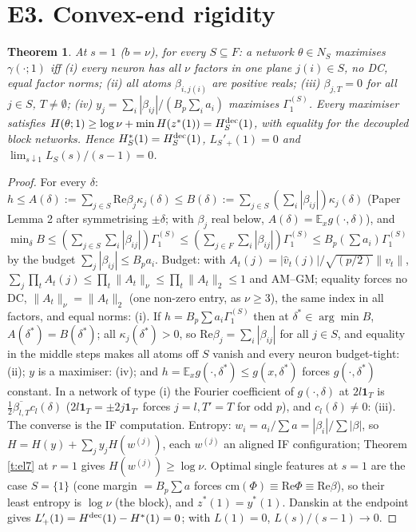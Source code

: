 \documentclass[11pt]{article}
\newtheorem{theorem}{Theorem}\newtheorem{lemma}[theorem]{Lemma}\newtheorem{proposition}[theorem]{Proposition}
\theoremstyle{remark}\newtheorem{remark}[theorem]{Remark}
\begin{document}
\section{E3. Convex-end rigidity}
\begin{theorem}\label{t:s1}
At $s=1$ ($b=\nu$), for every $S\subseteq F$: a network $\theta\in N_S$ maximises $\gamma(\cdot;1)$ iff (i) every neuron has all $\nu$ factors in one
plane $j(i)\in S$, no DC, equal factor norms; (ii) all atoms $\beta_{i,j(i)}$ are positive reals; (iii) $\beta_{j,T}=0$ for all $j\in S$, $T\ne\emptyset$;
(iv) $y_j=\sum_i|\beta_{ij}|/(B_p\sum_ia_i)$ maximises $\Gamma^{(S)}_1$. Every maximiser satisfies $H(\theta;1)\ge\log\nu+\min H(z^*(1))=H^{\rm dec}_S(1)$,
with equality for the decoupled block networks. Hence $H^*_S(1)=H^{\rm dec}_S(1)$, $L_S'{}_+(1)=0$ and $\lim_{s\downarrow1}L_S(s)/(s-1)=0$.
\end{theorem}
\begin{proof}
For every $\delta$: $h\le A(\delta):=\sum_{j\in S}\mathrm{Re}\beta_j\kappa_j(\delta)\le B(\delta):=\sum_{j\in S}(\sum_i|\beta_{ij}|)\kappa_j(\delta)$
(Paper Lemma 2 after symmetrising $\pm\delta$; with $\beta_j$ real below, $A(\delta)=\mathbb E_xg(\cdot,\delta)$), and $\min_\delta B\le(\sum_{j\in S}\sum_i|\beta_{ij}|)\Gamma^{(S)}_1\le(\sum_{j\in F}\sum_i|\beta_{ij}|)\Gamma^{(S)}_1\le B_p(\sum a_i)\Gamma^{(S)}_1$ by the budget
$\sum_j|\beta_{ij}|\le B_pa_i$. Budget: with $A_t(j)=|\hat v_t(j)|/\sqrt{(p/2)}\|v_t\|$,
$\sum_j\prod_tA_t(j)\le\prod_t\|A_t\|_\nu\le\prod_t\|A_t\|_2\le1$ and AM--GM; equality forces no DC, $\|A_t\|_\nu=\|A_t\|_2$ (one non-zero entry, as $\nu\ge3$),
the same index in all factors, and equal norms: (i). If $h=B_p\sum a_i\Gamma_1^{(S)}$ then at $\delta^*\in\arg\min B$, $A(\delta^*)=B(\delta^*)$; all $\kappa_j(\delta^*)>0$,
so $\mathrm{Re}\beta_j=\sum_i|\beta_{ij}|$ for all $j\in S$, and equality in the middle steps makes all atoms off $S$ vanish and every neuron budget-tight: (ii); $y$ is a maximiser: (iv); and $h=\mathbb E_xg(\cdot,\delta^*)\le g(x,\delta^*)$ forces
$g(\cdot,\delta^*)$ constant. In a network of type (i) the Fourier coefficient of $g(\cdot,\delta)$ at $2l\mathbf 1_T$ is
$\frac12\overline{\beta_{l,T}}c_l(\delta)$ ($2l\mathbf1_T=\pm2j\mathbf1_{T'}$ forces $j=l,T'=T$ for odd $p$), and $c_l(\delta)\ne0$: (iii). The converse is the IF computation.
Entropy: $w_i=a_i/\sum a=|\beta_i|/\sum|\beta|$, so $H=H(y)+\sum_jy_jH(w^{(j)})$, each $w^{(j)}$ an aligned IF configuration;
Theorem \ref{t:el7} at $r=1$ gives $H(w^{(j)})\ge\log\nu$. Optimal single features at $s=1$ are the case $S=\{1\}$ (cone margin $=B_p\sum a$ forces
$\mathrm{cm}(\Phi)\equiv\mathrm{Re}\Phi\equiv\mathrm{Re}\beta$), so their least entropy is $\log\nu$ (the block), and $z^*(1)=y^*(1)$.
Danskin at the endpoint gives $L'_+(1)=H^{\rm dec}(1)-H^*(1)=0$; with $L(1)=0$, $L(s)/(s-1)\to0$.
\end{proof}
\end{document}
